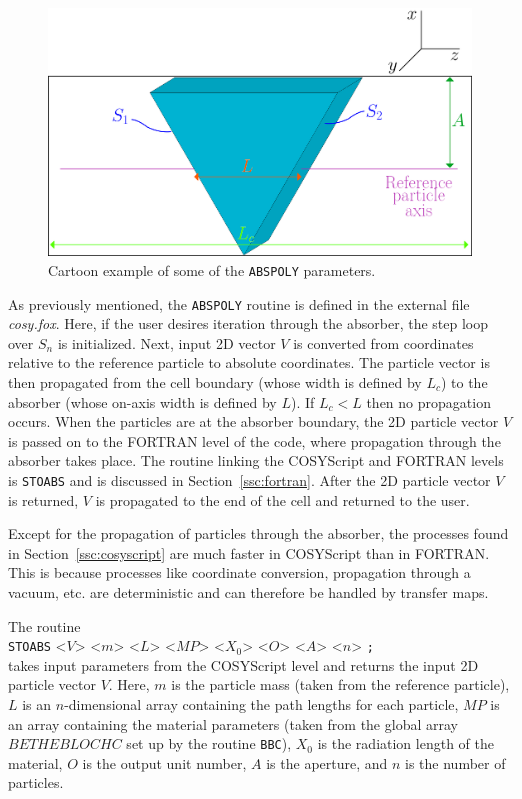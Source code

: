 \begin{figure}[!htb]
  \centering
    \includegraphics[width=\textwidth]{Figures/abspoly} 
  \caption{Cartoon example of some of the \texttt{ABSPOLY} parameters.}
  \label{fig:abspoly}
\end{figure}

\label{ssc:cosyscript}

As previously mentioned, the \texttt{ABSPOLY} routine is defined in the external file \textit{cosy.fox}. Here, if the user desires iteration through the absorber, the step loop over $S_n$ is initialized. Next, input 2D vector $V$ is converted from coordinates relative to the reference particle to absolute coordinates. The particle vector is then propagated from the cell boundary (whose width is defined by $L_c$) to the absorber (whose on-axis width is defined by $L$). If $L_c<L$ then no propagation occurs. When the particles are at the absorber boundary, the 2D particle vector $V$ is passed on to the FORTRAN level of the code, where propagation through the absorber takes place. The routine linking the COSYScript and FORTRAN levels is \texttt{STOABS} and is discussed in Section~\ref{ssc:fortran}. After the 2D particle vector $V$ is returned, $V$ is propagated to the end of the cell and returned to the user.

\label{ssc:fortran}

Except for the propagation of particles through the absorber, the processes found in Section~\ref{ssc:cosyscript} are much faster in COSYScript than in FORTRAN. This is because processes like coordinate conversion, propagation through a vacuum, etc. are deterministic and can therefore be handled by transfer maps.

The routine\\
\texttt{STOABS} <$V$> <$m$> <$L$> <$MP$> <$X_0$> <$O$> <$A$> <$n$> \texttt{;} \\
takes input parameters from the COSYScript level and returns the input 2D particle vector $V$. Here, $m$ is the particle mass (taken from the reference particle), $L$ is an $n$-dimensional array containing the path lengths for each particle, $MP$ is an array containing the material parameters (taken from the global array $BETHEBLOCHC$ set up by the routine \texttt{BBC}), $X_0$ is the radiation length of the material, $O$ is the output unit number, $A$ is the aperture, and $n$ is the number of particles.

